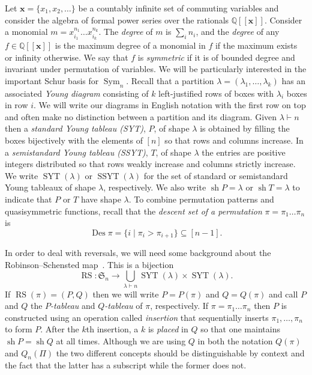 \documentclass[10pt]{amsart}
\DeclareMathOperator{\SSYT}{SSYT}
\DeclareMathOperator{\RS}{RS}
\newcommand{\sbe}{\subseteq}
\newcommand{\ptn}{\vdash}
\newcommand{\ra}{\rightarrow}
\newcommand{\la}{\lambda}
\newcommand{\bx}{\mathbf{x}}
\newcommand{\bbQ}{{\mathbb Q}}
\newcommand{\fS}{{\mathfrak S}}
\DeclareMathOperator{\Des}{Des}
\DeclareMathOperator{\sh}{sh}
\DeclareMathOperator{\Sym}{{Sym}}
\DeclareMathOperator{\SYT}{SYT}
\newcommand\llbracket{[\![}
\newcommand\rrbracket{]\!]}
\begin{document}
Let $\bx=\{x_1,x_2,\dots\}$ be a countably infinite set of commuting variables and consider the algebra of formal power series over the rationals $\bbQ\llbracket \bx\rrbracket$. Consider a monomial $m=x_{i_1}^{n_1}\dots x_{i_k}^{n_k}$. The \emph{degree} of $m$ is $\sum_i n_i$, and the \emph{degree} of any $f\in\bbQ\llbracket \bx\rrbracket$ is the maximum degree of a monomial in $f$ if the maximum exists or infinity otherwise. We say that $f$ is \emph{symmetric} if it is of bounded degree and invariant under permutation of variables. 
We will be particularly interested in the important Schur basis for $\Sym_n$. Recall that a partition $\la=(\la_1,\dots,\la_k)$ has an associated \emph{Young diagram} consisting of $k$ left-justified rows of boxes with $\la_i$ boxes in row $i$. We will write our diagrams in English notation with the first row on top and often make no distinction between a partition and its diagram. Given $\la\ptn n$ then a \emph{standard Young tableau (SYT)}, $P$, of shape $\la$ is obtained by filling the boxes bijectively with the elements of $[n]$ so that rows and columns increase. In a \emph{semistandard Young tableau (SSYT)}, $T$, of shape $\la$ the entries are positive integers distributed so that rows weakly increase and columns strictly increase. 
We write $\SYT(\la)$ or $\SSYT(\la)$ for the set of standard or semistandard Young tableaux of shape $\la$, respectively. 
We also write $\sh P=\la$ or $\sh T=\la$ to indicate that $P$ or $T$ have shape $\la$.
To combine permutation patterns and quasisymmetric functions, recall that the \emph{descent set of a permutation}
$\pi=\pi_1\dots\pi_n$ is
\[
\Des\pi=\{i \mid \pi_i>\pi_{i+1}\}\sbe[n-1].
\]
\setcounter{section}{2}\setcounter{theo}{1}

In order to deal with reversals, we will need some background about the Robinson--Schensted map~\cite{rob:rsg,sch:lid}. This is a bijection
\[
\RS:\fS_n\ra\bigcup_{\la\ptn n} \SYT(\la)\times\SYT(\la).
\]
If $\RS(\pi)=(P,Q)$ then we will write $P=P(\pi)$ and $Q=Q(\pi)$ and call $P$ and $Q$ the \emph{$P$-tableau} and \emph{$Q$-tableau} of $\pi$, respectively.
If $\pi=\pi_1\dots\pi_n$ then $P$ is constructed using an operation called \emph{insertion} that sequentially inserts $\pi_1,\dots,\pi_n$ to form $P$. After the $k$th insertion, a $k$ is \emph{placed} in $Q$ so that one maintains $\sh P=\sh Q$ at all times. Although we are using $Q$ in both the notation $Q(\pi)$ and $Q_n(\Pi)$ the two different concepts should be distinguishable by context and the fact that the latter has a subscript while the former does not. 
\end{document}
